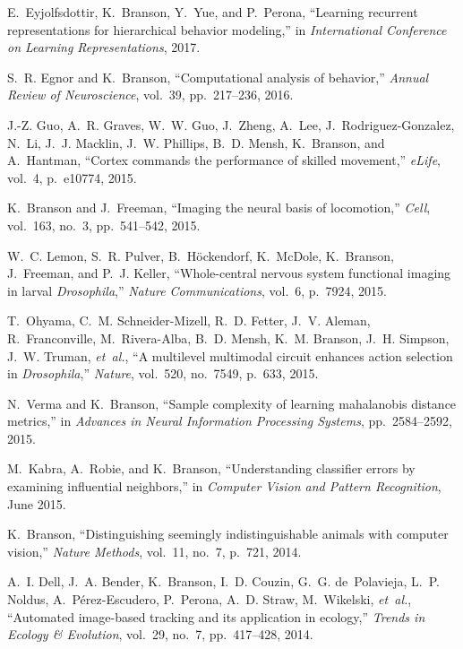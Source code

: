 \begin{cvenum}
\item E.~Eyjolfsdottir, K.~Branson, Y.~Yue, and P.~Perona,
  ``Learning recurrent representations for hierarchical behavior modeling,'' in
  {\em International Conference on Learning Representations},
  2017.

\item S.~R. Egnor and K.~Branson, ``Computational analysis of behavior,'' {\em Annual
  Review of Neuroscience}, vol.~39, pp.~217--236, 2016.

\item J.-Z. Guo, A.~R. Graves, W.~W. Guo, J.~Zheng, A.~Lee,
  J.~Rodriguez-Gonzalez, N.~Li, J.~J. Macklin, J.~W. Phillips, B.~D. Mensh,
  K.~Branson, and A.~Hantman, ``Cortex commands the performance of skilled
  movement,'' {\em e{L}ife}, vol.~4, p.~e10774, 2015.

\item K.~Branson and J.~Freeman, ``Imaging the neural basis of locomotion,'' {\em
  Cell}, vol.~163, no.~3, pp.~541--542, 2015.

\item W.~C. Lemon, S.~R. Pulver, B.~H{\"o}ckendorf, K.~McDole, K.~Branson,
  J.~Freeman, and P.~J. Keller, ``Whole-central nervous system functional
  imaging in larval {\em {{D}}rosophila},'' {\em Nature Communications}, vol.~6, p.~7924,
  2015.

\item T.~Ohyama, C.~M. Schneider-Mizell, R.~D. Fetter, J.~V. Aleman, R.~Franconville, M.~Rivera-Alba, B.~D. Mensh, K.~M. Branson, J.~H. Simpson, J.~W. Truman, {\em et~al.}, ``A multilevel multimodal circuit enhances action selection in {\em {{D}}rosophila},'' {\em Nature}, vol.~520, no.~7549, p.~633, 2015.

\item N.~Verma and K.~Branson, ``Sample complexity of learning mahalanobis distance metrics,'' in {\em Advances in Neural Information Processing Systems}, pp.~2584--2592, 2015.

\item M.~Kabra, A.~Robie, and K.~Branson, ``Understanding classifier errors by
  examining influential neighbors,'' in {\em Computer Vision and Pattern
  Recognition}, June 2015.

\item K.~Branson, ``Distinguishing seemingly indistinguishable animals with computer
  vision,'' {\em Nature Methods}, vol.~11, no.~7, p.~721, 2014.

\item A.~I. Dell, J.~A. Bender, K.~Branson, I.~D. Couzin, G.~G. de~Polavieja, L.~P.
  Noldus, A.~P{\'e}rez-Escudero, P.~Perona, A.~D. Straw, M.~Wikelski, {\em
  et~al.}, ``Automated image-based tracking and its application in ecology,''
  {\em Trends in Ecology \& Evolution}, vol.~29, no.~7, pp.~417--428, 2014.


\end{cvenum}
